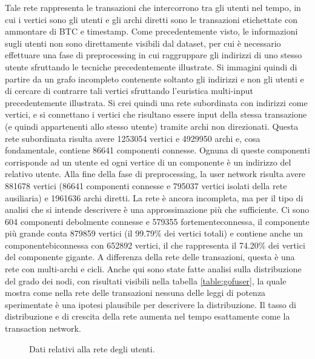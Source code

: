 Tale rete rappresenta le transazioni che intercorrono tra gli utenti nel tempo, in cui i vertici sono gli utenti e gli archi diretti sono le transazioni etichettate con ammontare di BTC e timestamp.
Come precedentemente visto, le informazioni sugli utenti non sono direttamente visibili dal dataset, per cui è necessario effettuare una fase di preprocessing in cui raggruppare gli indirizzi di uno stesso utente sfruttando le tecniche precedentemente illustrate.
Si immagini quindi di partire da un grafo incompleto contenente soltanto gli indirizzi e non gli utenti e di cercare di contrarre tali vertici sfruttando l'euristica multi-input precedentemente illustrata.
Si crei quindi una rete subordinata con indirizzi come vertici, e si connettano i vertici che risultano essere input della stessa transazione (e quindi appartenenti allo stesso utente) tramite archi non direzionati. Questa rete subordinata risulta avere 1253054 vertici e 4929950 archi e, cosa fondamentale, contiene 86641 componenti connesse. Ognuna di queste componenti corrisponde ad un utente ed ogni vertice di un componente è un indirizzo del relativo utente.
Alla fine della fase di preprocessing, la user network risulta avere 881678 vertici (86641 componenti connesse e 795037 vertici isolati della rete ausiliaria) e 1961636 archi diretti. La rete è ancora incompleta, ma per il tipo di analisi che si intende descrivere è una approssimazione più che sufficiente. Ci sono 604 componenti debolmente connesse e 579355 \gls{fortementeconnessa}, il componente più grande conta 879859 vertici (il 99.79\% dei vertici totali) e contiene anche un \gls{componentebiconnessa} con 652892 vertici, il che rappresenta il 74.20\% dei vertici del componente gigante.
A differenza della rete delle transazioni, questa è una rete con multi-archi e cicli.
Anche qui sono state fatte analisi sulla distribuzione del grado dei nodi, con risultati visibili nella tabella \ref{table:gofuser}, la quale mostra come nella rete delle transazioni nessuna delle leggi di potenza sperimentate è una ipotesi plausibile per descrivere la distribuzione. Il tasso di distribuzione e di crescita della rete aumenta nel tempo esattamente come la transaction network.

\begin{figure}[htbp]
  \centering
  \hfill
  \par
  \par
  \hfill
  \hfill
  \caption[User Network]{Dati relativi alla rete degli utenti.\label{anonimity_1.4}}
\end{figure}

